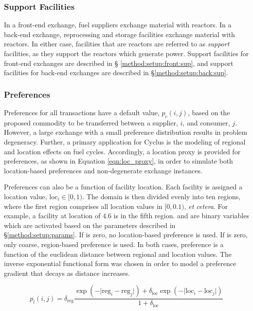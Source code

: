 \subsubsection{Support Facilities}

In a front-end exchange, fuel suppliers exchange material with reactors. In a
back-end exchange, reprocessing and storage facilities exchange material with
reactors. In either case, facilities that are  reactors are referred
to as \textit{support} facilities, as they support the reactors which generate
power. Support facilities for front-end exchanges are described in \S
\ref{method:setup:front:sup}, and support facilities for back-end exchanges are
described in \S \ref{method:setup:back:sup}.

\subsubsection{Preferences}\label{method:setup:features:prefs}

Preferences for all transactions have a default value, $p_{c}(i, j)$, based on
the proposed commodity to be transferred between a supplier, $i$, and consumer,
$j$. However, a large exchange with a small preference distribution results in
problem degeneracy. Further, a primary application for Cyclus is the modeling of
regional and location effects on fuel cycles. Accordingly, a location proxy is
provided for preferences, as shown in Equation \ref{eqn:loc_proxy}, in order to
simulate both location-based preferences and non-degenerate exchange instances.

Preferences can also be a function of facility location. Each facility is
assigned a location value, $\text{loc}_i \in [0, 1)$. The domain is then
  divided evenly into ten regions, where the first region comprises all location
  values in $[0, 0.1)$, \textit{et cetera}. For example, a facility at location
    of $4.6$ is in the fifth region. \dreg and
    \dloc are binary variables which are activated based on the
    parameters described in \S \ref{method:setup:params}. If
    \dreg is zero, no location-based preference is used. If
    \dloc is zero, only coarse, region-based preference is
    used. In both cases, preference is a function of the euclidean distance
    between regional and location values. The inverse exponential functional
    form was chosen in order to model a preference gradient that decays as
    distance increases.

\begin{equation}\label{eqn:loc_proxy}
p_{l}(i, j) = \delta_{\text{reg}} 
\frac{\exp(- \lvert \text{reg}_{i} - \text{reg}_{j} \rvert ) + \delta_{\text{loc}}
  \exp(- \lvert \text{loc}_{i} - \text{loc}_{j} \rvert )}
     {1 + \delta_{\text{loc}}}
\end{equation}


